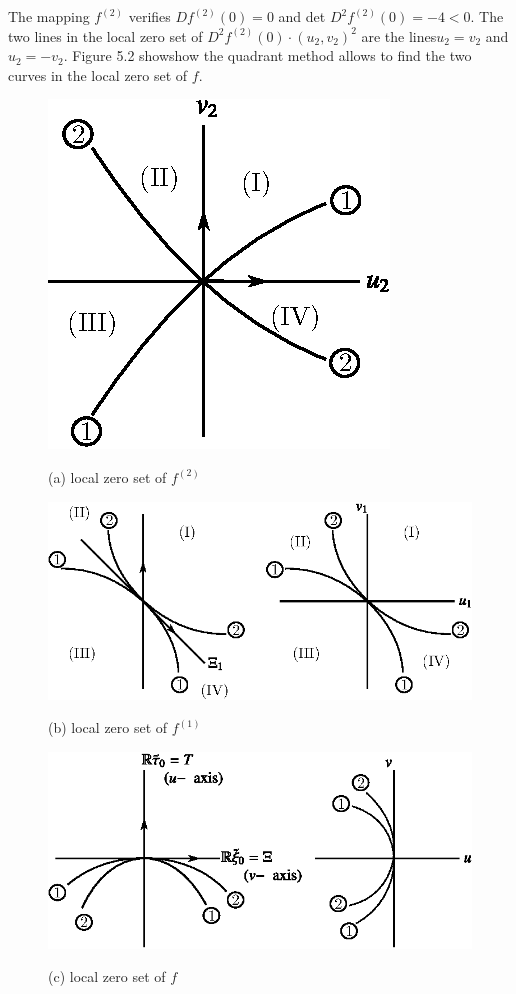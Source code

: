 The mapping $f^{(2)}$ verifies $Df^{(2)}(0) = 0$ and det $D^{2}f^{(2)}(0) = -4 < 0$. The two lines in the local zero set of $D^{2}f^{(2)}(0) \cdot (u_{2}, v_{2})^{2}$ are the lines\pageoriginale $u_{2} = v_{2}$ and $u_{2} = -v_{2}$. Figure 5.2 showshow the quadrant method allows to find the two curves in the local zero set of $f$.
\begin{figure}[H]
\centering
\includegraphics{figure/fig76-5.2a.eps}

{(a) local zero set of $f^{(2)}$}

\bigskip

\includegraphics{figure/fig76-5.2b.eps}

{(b) local zero set of $f^{(1)}$}

\bigskip
\includegraphics{figure/fig76-5.2c.eps}


{(c) local zero set of $f$}
\caption{}
\end{figure}



